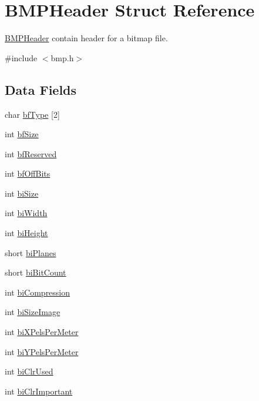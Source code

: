 \hypertarget{struct_b_m_p_header}{\section{B\-M\-P\-Header Struct Reference}
\label{struct_b_m_p_header}
}


\hyperlink{struct_b_m_p_header}{B\-M\-P\-Header} contain header for a bitmap file.  




{\ttfamily \#include $<$bmp.\-h$>$}

\subsection*{Data Fields}
\begin{DoxyCompactItemize}
\item 
char \hyperlink{struct_b_m_p_header_ac6cb60ac603fc181a760b3d252c85829}{bf\-Type} \mbox{[}2\mbox{]}
\item 
int \hyperlink{struct_b_m_p_header_abff21fa85cedcc94d4949ed5214e8dc2}{bf\-Size}
\item 
int \hyperlink{struct_b_m_p_header_af31f2c0e9e9e9adf7327c70ca2b52a64}{bf\-Reserved}
\item 
int \hyperlink{struct_b_m_p_header_a932d1972e87bc927f385b50d374dbaad}{bf\-Off\-Bits}
\item 
int \hyperlink{struct_b_m_p_header_adf06257c48b39f5858d2e07d85eaf444}{bi\-Size}
\item 
int \hyperlink{struct_b_m_p_header_ace6c561432416b3580c63d8ff417769d}{bi\-Width}
\item 
int \hyperlink{struct_b_m_p_header_aef892a195d593f028267e1e28995ceea}{bi\-Height}
\item 
short \hyperlink{struct_b_m_p_header_ae86ef424e75373d65c827825cbd3ad57}{bi\-Planes}
\item 
short \hyperlink{struct_b_m_p_header_aba79d93395d17ce8b58efd73a3ccd4c5}{bi\-Bit\-Count}
\item 
int \hyperlink{struct_b_m_p_header_ad92c25fd24fe77a53ad1cb5bbecf2e74}{bi\-Compression}
\item 
int \hyperlink{struct_b_m_p_header_a68e2cd9db6e5f913d47c13e68b6d47c8}{bi\-Size\-Image}
\item 
int \hyperlink{struct_b_m_p_header_a8e1b6c75b62310e58d67b6c9d92c6e76}{bi\-X\-Pels\-Per\-Meter}
\item 
int \hyperlink{struct_b_m_p_header_ae4128f44823bc8af79105ba92ad33ec8}{bi\-Y\-Pels\-Per\-Meter}
\item 
int \hyperlink{struct_b_m_p_header_a536ccf8791198f9379357e5c4b17bc17}{bi\-Clr\-Used}
\item 
int \hyperlink{struct_b_m_p_header_a90f7e4028ab6037cbb7591fac3b83d23}{bi\-Clr\-Important}
\end{DoxyCompactItemize}


